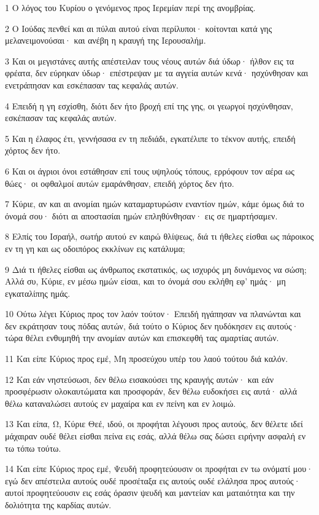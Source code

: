 \par 1 Ο λόγος του Κυρίου ο γενόμενος προς Ιερεμίαν περί της ανομβρίας.
\par 2 Ο Ιούδας πενθεί και αι πύλαι αυτού είναι περίλυποι· κοίτονται κατά γης μελανειμονούσαι· και ανέβη η κραυγή της Ιερουσαλήμ.
\par 3 Και οι μεγιστάνες αυτής απέστειλαν τους νέους αυτών διά ύδωρ· ήλθον εις τα φρέατα, δεν εύρηκαν ύδωρ· επέστρεψαν με τα αγγεία αυτών κενά· ησχύνθησαν και ενετράπησαν και εσκέπασαν τας κεφαλάς αυτών.
\par 4 Επειδή η γη εσχίσθη, διότι δεν ήτο βροχή επί της γης, οι γεωργοί ησχύνθησαν, εσκέπασαν τας κεφαλάς αυτών.
\par 5 Και η έλαφος έτι, γεννήσασα εν τη πεδιάδι, εγκατέλιπε το τέκνον αυτής, επειδή χόρτος δεν ήτο.
\par 6 Και οι άγριοι όνοι εστάθησαν επί τους υψηλούς τόπους, ερρόφουν τον αέρα ως θώες· οι οφθαλμοί αυτών εμαράνθησαν, επειδή χόρτος δεν ήτο.
\par 7 Κύριε, αν και αι ανομίαι ημών καταμαρτυρώσιν εναντίον ημών, κάμε όμως διά το όνομά σου· διότι αι αποστασίαι ημών επληθύνθησαν· εις σε ημαρτήσαμεν.
\par 8 Ελπίς του Ισραήλ, σωτήρ αυτού εν καιρώ θλίψεως, διά τι ήθελες είσθαι ως πάροικος εν τη γη και ως οδοιπόρος εκκλίνων εις κατάλυμα;
\par 9 Διά τι ήθελες είσθαι ως άνθρωπος εκστατικός, ως ισχυρός μη δυνάμενος να σώση; Αλλά συ, Κύριε, εν μέσω ημών είσαι, και το όνομά σου εκλήθη εφ' ημάς· μη εγκαταλίπης ημάς.
\par 10 Ούτω λέγει Κύριος προς τον λαόν τούτον· Επειδή ηγάπησαν να πλανώνται και δεν εκράτησαν τους πόδας αυτών, διά τούτο ο Κύριος δεν ηυδόκησεν εις αυτούς· τώρα θέλει ενθυμηθή την ανομίαν αυτών και επισκεφθή τας αμαρτίας αυτών.
\par 11 Και είπε Κύριος προς εμέ, Μη προσεύχου υπέρ του λαού τούτου διά καλόν.
\par 12 Και εάν νηστεύσωσι, δεν θέλω εισακούσει της κραυγής αυτών· και εάν προσφέρωσιν ολοκαυτώματα και προσφοράν, δεν θέλω ευδοκήσει εις αυτά· αλλά θέλω καταναλώσει αυτούς εν μαχαίρα και εν πείνη και εν λοιμώ.
\par 13 Και είπα, Ω, Κύριε Θεέ, ιδού, οι προφήται λέγουσι προς αυτούς, δεν θέλετε ιδεί μάχαιραν ουδέ θέλει είσθαι πείνα εις εσάς, αλλά θέλω σας δώσει ειρήνην ασφαλή εν τω τόπω τούτω.
\par 14 Και είπε Κύριος προς εμέ, Ψευδή προφητεύουσιν οι προφήται εν τω ονόματί μου· εγώ δεν απέστειλα αυτούς ουδέ προσέταξα εις αυτούς ουδέ ελάλησα προς αυτούς· αυτοί προφητεύουσιν εις εσάς όρασιν ψευδή και μαντείαν και ματαιότητα και την δολιότητα της καρδίας αυτών.
